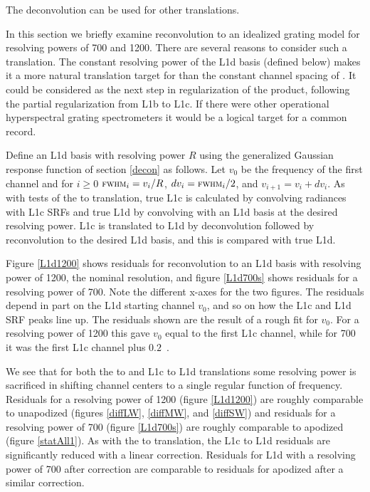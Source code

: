 \documentclass[10pt,twocolumn]{article}
\begin{document}

The {\airs} deconvolution can be used for other translations.  

In this section we briefly examine reconvolution to an idealized
grating model for resolving powers of 700 and 1200.  There are
several reasons to consider such a translation.  The constant
resolving power of the L1d basis (defined below) makes it a more
natural translation target for {\airs} than the constant channel
spacing of {\cris}.  It could be considered as the next step in
regularization of the {\airs} product, following the partial
regularization from L1b to L1c.  If there were other operational
hyperspectral grating spectrometers it would be a logical target 
for a common record.

Define an {\airs} L1d basis with resolving power $R$ using the
generalized Gaussian response function of section \ref{decon} as
follows.  Let $v_0$ be the frequency of the first channel and for
$i\ge0$ $\mbox{\small\textsc{fwhm}}_i = v_i / R$, $dv_i = \mbox{\small\textsc{fwhm}}_i / 2$, and $v_{i+1} =
v_i + dv_i$.  As with tests of the {\airs} to {\cris} translation,
true L1c is calculated by convolving {\kcarta} radiances with
{\airs} L1c SRFs and true L1d by convolving with an L1d basis at the
desired resolving power.  L1c is translated to L1d by deconvolution
followed by reconvolution to the desired L1d basis, and this is
compared with true L1d.

Figure \ref{L1d1200} shows residuals for reconvolution to an L1d
basis with resolving power of 1200, the nominal {\airs} resolution,
and figure \ref{L1d700s} shows residuals for a resolving power of
700.  Note the different x-axes for the two figures.  The residuals
depend in part on the L1d starting channel $v_0$, and so on how the
L1c and L1d SRF peaks line up.  The residuals shown are the result
of a rough fit for $v_0$.  For a resolving power of 1200 this gave
$v_0$ equal to the first L1c channel, while for 700 it was the first
L1c channel plus $0.2$~\wn.

We see that for both the {\airs} to {\cris} and L1c to L1d
translations some resolving power is sacrificed in shifting channel
centers to a single regular function of frequency.  Residuals for a
resolving power of 1200 (figure \ref{L1d1200}) are roughly
comparable to unapodized {\cris} (figures \ref{diffLW},
\ref{diffMW}, and \ref{diffSW}) and residuals for a resolving power
of 700 (figure \ref{L1d700s}) are roughly comparable to apodized
{\cris} (figure \ref{statAll1}).  As with the {\airs} to {\cris}
translation, the L1c to L1d residuals are significantly reduced with
a linear correction.  Residuals for L1d with a resolving power of
700 after correction are comparable to residuals for apodized
{\cris} after a similar correction.
\end{document}
